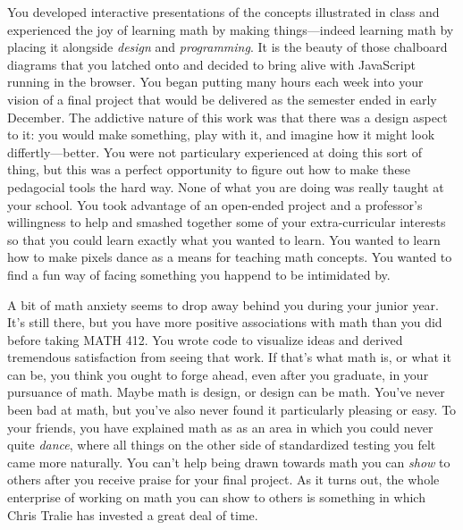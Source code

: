 \documentclass[../main.tex]{subfiles}
\begin{document}
You developed interactive presentations of the concepts illustrated in class and experienced the joy of learning math by making things---indeed learning math by placing it alongside \textit{design} and \textit{programming}. It is the beauty of those chalboard diagrams that you latched onto and decided to bring alive with JavaScript running in the browser. You began putting many hours each week into your vision of a final project that would be delivered as the semester ended in early December. The addictive nature of this work was that there was a design aspect to it: you would make something, play with it, and imagine how it might look differtly---better. You were not particulary experienced at doing this sort of thing, but this was a perfect opportunity to figure out how to make these pedagocial tools the hard way. None of what you are doing was really taught at your school. You took advantage of an open-ended project and a professor's willingness to help and smashed together some of your extra-curricular interests so that you could learn exactly what you wanted to learn. You wanted to learn how to make pixels dance as a means for teaching math concepts. You wanted to find a fun way of facing something you happend to be intimidated by.

A bit of math anxiety seems to drop away behind you during your junior year. It's still there, but you have more positive associations with math than you did before taking MATH 412. You wrote code to visualize ideas and derived tremendous satisfaction from seeing that work. If that's what math is, or what it can be, you think you ought to forge ahead, even after you graduate, in your pursuance of math. Maybe math is design, or design can be math. You've never been bad at math, but you've also never found it particularly pleasing or easy. To your friends, you have explained math as as an area in which you could never quite \textit{dance}, where all things on the other side of standardized testing you felt came more naturally. You can't help being drawn towards math you can \textit{show} to others after you receive praise for your final project. As it turns out, the whole enterprise of working on math you can show to others is something in which Chris Tralie has invested a great deal of time.
\end{document}

